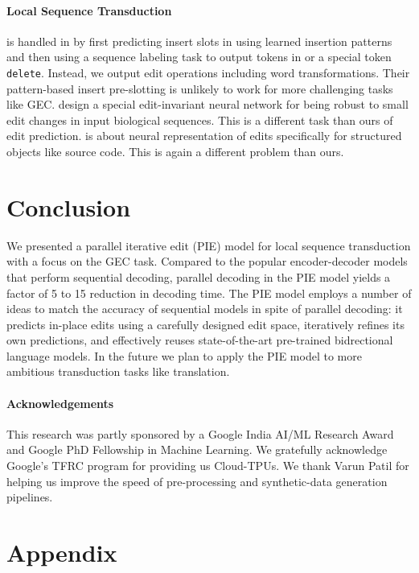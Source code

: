 \documentclass[11pt,a4paper]{article}
\begin{document}
\paragraph{Local Sequence Transduction}
is handled in \citet{Ribeiro2018} by first predicting insert slots in  using learned  insertion patterns and then using a sequence labeling task to output tokens in  or a special token {\tt delete}.   Instead, we output edit operations including word transformations. Their pattern-based insert pre-slotting is unlikely to work for more challenging tasks like GEC.
\citet{Koide2018} design a special edit-invariant neural network for being robust to small edit changes in input biological sequences.  This is a different task than ours of edit prediction. \citet{yin2018learning} is about neural representation of edits specifically for structured objects like source code. This is again a different problem than ours.

\section{Conclusion}
We presented a parallel iterative edit (PIE) model for local sequence transduction with a focus on the GEC task. 
Compared to the popular encoder-decoder models that perform sequential decoding, parallel decoding in the PIE model yields a factor of 5 to 15 reduction in decoding time.
The PIE model employs a number of ideas to match the accuracy of sequential models in spite of parallel decoding:  it predicts in-place edits using a carefully designed edit space, iteratively refines its own predictions, and effectively reuses state-of-the-art pre-trained bidrectional language models. In the future we plan to apply the PIE model to more ambitious transduction tasks like translation.

\paragraph{\bf Acknowledgements} This research was partly sponsored by a Google India AI/ML Research Award and Google PhD Fellowship in Machine Learning. We gratefully acknowledge Google's TFRC program for providing us Cloud-TPUs. We thank Varun Patil for helping us improve the speed of pre-processing and synthetic-data generation pipelines.




\newpage
\onecolumn
\appendix

\section{Appendix}
\end{document}
